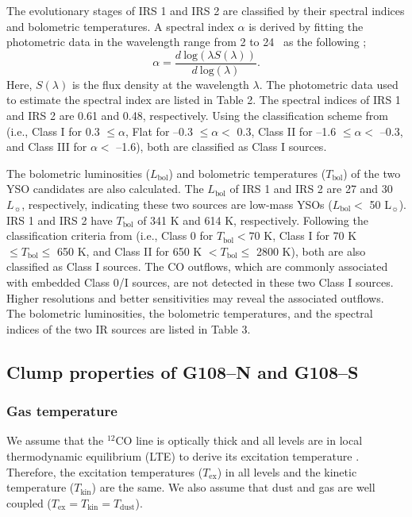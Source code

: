 \documentclass[manuscript]{aastex}
\begin{document}
The evolutionary stages of IRS 1 and IRS 2 are classified by their spectral indices and bolometric temperatures.
A spectral index $\alpha$ is derived by fitting the photometric data in the wavelength range from 2 to 24 \m\ as the following \citep{evans09};
\begin{equation}
\alpha = \frac{d\ \textrm{log}(\lambda S(\lambda))}{d\ \textrm{log}(\lambda)}.
\end{equation}
Here, $S(\lambda)$ is the flux density at the wavelength $\lambda$.
The photometric data used to estimate the spectral index are listed in Table 2.
The spectral indices of IRS 1 and IRS 2 are 0.61 and 0.48, respectively.
Using the classification scheme from \citet{evans09} (i.e., Class I for 0.3 $\leq \alpha$, Flat for --0.3 $\leq \alpha <$ 0.3, Class II for --1.6 $\leq \alpha <$ --0.3, and Class III for $\alpha <$ --1.6), both are classified as Class I sources.

The bolometric luminosities ($L_{\textrm{bol}}$) and bolometric temperatures ($T_{\textrm{bol}}$) of the two YSO candidates are also calculated.
The $L_{\textrm{bol}}$ of IRS 1 and IRS 2 are 27 and 30 $L_{\sun}$, respectively, indicating these two sources are low-mass YSOs ($L_{\textrm{bol}} <$ 50 L$_{\sun}$).
IRS 1 and IRS 2 have $T_{\textrm{bol}}$ of 341 K and 614 K, respectively.
Following the classification criteria from \citet{myers93} (i.e., Class 0 for $T_{\textrm{bol}} < 70$ K, Class I for 70 K $\leq T_{\textrm{bol}} \leq$ 650 K, and Class II for 650 K $< T_{\textrm{bol}} \leq$ 2800 K), both are also classified as Class I sources.
The CO outflows, which are commonly associated with embedded Class 0/I sources, are not detected in these two Class I sources.
Higher resolutions and better sensitivities may reveal the associated outflows.
The bolometric luminosities, the bolometric temperatures, and the spectral indices of the two IR sources are listed in Table 3.

\subsection{Clump properties of G108--N and G108--S}

\subsubsection{Gas temperature}

We assume that the $^{12}$CO line is optically thick and all levels are in local thermodynamic equilibrium (LTE) to derive its excitation temperature \citep{liu13}.
Therefore, the excitation temperatures ($T_{\textrm{ex}}$) in all levels and the kinetic temperature ($T_{\textrm{kin}}$) are the same.
We also assume that dust and gas are well coupled ($T_{\textrm{ex}} = T_{\textrm{kin}} = T_{\textrm{dust}}$).
\end{document}
